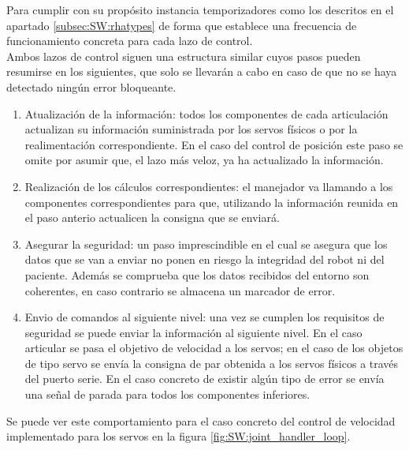         Para cumplir con su propósito instancia temporizadores como los descritos en el apartado \ref{subsec:SW:rhatypes} de forma que establece una frecuencia de funcionamiento concreta para cada lazo de control.
        \\
        
        Ambos lazos de control siguen una estructura similar cuyos pasos pueden resumirse en los siguientes, que solo se llevarán a cabo en caso de que no se haya detectado ningún error bloqueante.
        \begin{enumerate}
            \item Atualización de la información: todos los componentes de cada articulación actualizan su información suministrada por los servos físicos o por la realimentación correspondiente. En el caso del control de posición este paso se omite por asumir que, el lazo más veloz, ya ha actualizado la información.
            \item Realización de los cálculos correspondientes: el manejador va llamando a los componentes correspondientes para que, utilizando la información reunida en el paso anterio actualicen la consigna que se enviará.
            \item Asegurar la seguridad: un paso imprescindible en el cual se asegura que los datos que se van a enviar no ponen en riesgo la integridad del robot ni del paciente. Además se comprueba que los datos recibidos del entorno son coherentes, en caso contrario se almacena un marcador de error.
            \item Envio de comandos al siguiente nivel: una vez se cumplen los requisitos de seguridad se puede enviar la información al siguiente nivel. En el caso articular se pasa el objetivo de velocidad a los servos; en el caso de los objetos de tipo servo se envía la consigna de par obtenida a los servos físicos a través del puerto serie. En el caso concreto de existir algún tipo de error se envía una señal de parada para todos los componentes inferiores.
        \end{enumerate}
        Se puede ver este comportamiento para el caso concreto del control de velocidad implementado para los servos en la figura \ref{fig:SW:joint_handler_loop}.

